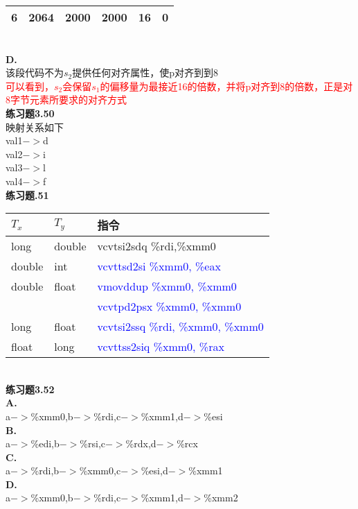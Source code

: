 \documentclass{article}
\newcommand{\blue}[1]{\textcolor{blue}{#1}}
\newcommand{\red}[1]{\textcolor{red}{#1}}
\begin{document}
\begin{CJK}{UTF8}{uyhei}
\begin{table}[htbp]
\begin{tabular}{|m{6em}<{\centering}m{6em}<{\centering}m{6em}<{\centering}m{6em}<{\centering}m{6em}<{\centering}m{6em}<{\centering}|}
6	&	2064	&	2000	&	2000	&	16	&	0	\\
\hline
\end{tabular}
\end{table}	\\[2ex]
\textbf{D.}	\\
该段代码不为$s_2$提供任何对齐属性，使p对齐到到8	\\
\red{可以看到，$s_2$会保留$s_1$的偏移量为最接近16的倍数，并将p对齐到8的倍数，正是对8字节元素所要求的对齐方式}	\\[3ex]
\textbf{练习题3.50}	\\
映射关系如下	\\
val1$->$d	\\
val2$->$i	\\
val3$->$l	\\
val4$->$f	\\[3ex]
\newpage
\noindent\textbf{练习题.51}	\\
\renewcommand\arraystretch{1.4}
\begin{table}[htbp]
\centering
\begin{tabular}{|m{6em}<{\centering}|m{6em}<{\centering}|m{16em}<{\centering}|}
\hline
$T_x$	&	$T_y$	&	指令	\\
\hline
long	&	double	&	vcvtsi2sdq \%rdi,\%xmm0	\\
\hline
double	&	int	&	\blue{vcvttsd2si \%xmm0, \%eax}	\\
\hline
double	&	float	&	\blue{vmovddup \%xmm0, \%xmm0}	\\
	&		&	\blue{vcvtpd2psx \%xmm0, \%xmm0}	\\
\hline
long	&	float	&	\blue{vcvtsi2ssq \%rdi, \%xmm0, \%xmm0}	\\
\hline
float	&	long	&	\blue{vcvttss2siq \%xmm0, \%rax}	\\
\hline
\end{tabular}
\end{table}	\\[2ex]
\textbf{练习题3.52}	\\
\textbf{A.}	\\
a$->$\%xmm0,b$->$\%rdi,c$->$\%xmm1,d$->$\%esi	\\
\textbf{B.}	\\
a$->$\%edi,b$->$\%rsi,c$->$\%rdx,d$->$\%rcx	\\
\textbf{C.}	\\
a$->$\%rdi,b$->$\%xmm0,c$->$\%esi,d$->$\%xmm1	\\
\textbf{D.}	\\
a$->$\%xmm0,b$->$\%rdi,c$->$\%xmm1,d$->$\%xmm2	\\[3ex]

\end{CJK}
\end{document}
